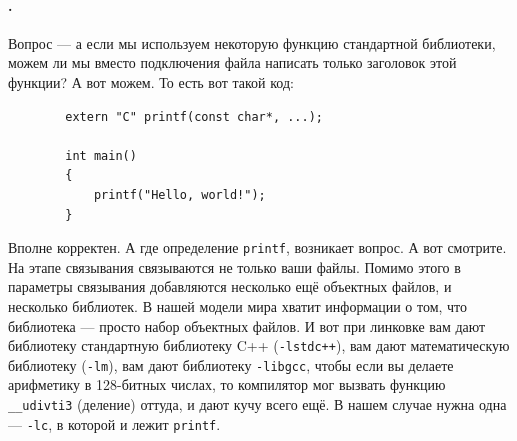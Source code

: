 \documentclass{article}
\begin{document}
    \paragraph{.}
    Вопрос --- а если мы используем некоторую функцию стандартной библиотеки, можем ли мы вместо подключения файла написать только заголовок этой функции? А вот можем. То есть вот такой код:
    \begin{verbatim}
        extern "C" printf(const char*, ...);
        
        int main()
        {
            printf("Hello, world!");
        }
    \end{verbatim}
    Вполне корректен. А где определение \texttt{printf}, возникает вопрос. А вот смотрите. На этапе связывания связываются не только ваши файлы. Помимо этого в параметры связывания добавляются несколько ещё объектных файлов, и несколько библиотек. В нашей модели мира хватит информации о том, что библиотека --- просто набор объектных файлов. И вот при линковке вам дают библиотеку стандартную библиотеку C++ (\texttt{-lstdc++}), вам дают математическую библиотеку (\texttt{-lm}), вам дают библиотеку \texttt{-libgcc}, чтобы если вы делаете арифметику в 128-битных числах, то компилятор мог вызвать функцию \texttt{__udivti3} (деление) оттуда, и дают кучу всего ещё. В нашем случае нужна одна --- \texttt{-lc}, в которой и лежит \texttt{printf}.
\end{document}
